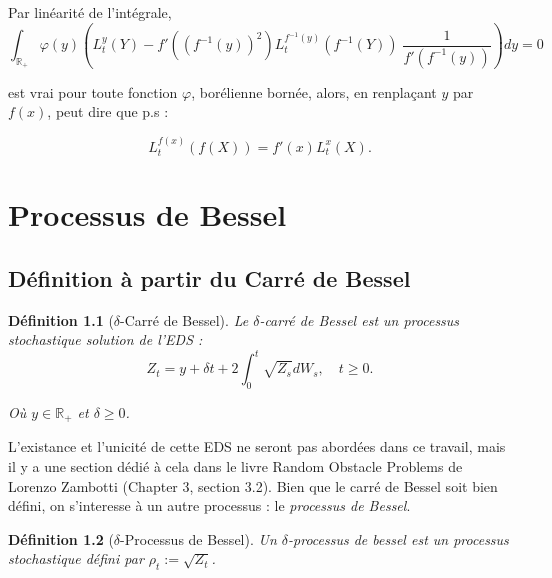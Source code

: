 \documentclass[openany]{book}
\makeatletter
\newcommand{\R}{\mathbb{R}}
\newcommand{\1}{\mathbbm{1}}
\renewenvironment{proof}[1][\textbf{\textit{Démonstration}}]{%
  \par\pushQED{\qed}%
  \normalfont\topsep6\p@\@plus6\p@\relax
  \trivlist\item[\hskip\labelsep
    #1\@addpunct{.}]\ignorespaces
}{%
  \popQED\endtrivlist\@endpefalse
}
\theoremstyle{thmfont}
\theoremstyle{deffont}
\newtheorem{definition}[definition]{Définition}
\theoremstyle{thmfont}
\theoremstyle{deffont}
\makeatother
\begin{document}
{\begin{proof}
Par linéarité de l'intégrale, 
$$\int_{\R_+} \varphi(y) \left( L_t^y(Y) -  f'\left((f^{-1}(y))^2\right) L_t^{f^{-1}(y)}(f^{-1}(Y)) \; \frac{1}{f'(f^{-1}(y))}\right) dy  = 0 $$

est vrai pour toute fonction $\varphi$, borélienne bornée, alors, en renplaçant $y$ par $f(x)$, peut dire que p.s :

$$L_t^{f(x)}(f(X)) =  f'(x) L_t^{x}(X).$$
\end{proof}
}

\chapter{Processus de Bessel}

\section{Définition à partir du Carré de Bessel} 
\begin{definition}[$\delta$-Carré de Bessel] Le \textit{$\delta$-carré de Bessel} est un processus stochastique solution de l'EDS :
  \begin{equation}
    Z_t = y + \delta t + 2 \int_0^t \sqrt{Z_s} dW_s, \quad t\geq0.
    \label{eq:EDSCarreBessel}
  \end{equation}

  Où $y\in\R_+$ et $\delta \geq 0$. 
\end{definition}

L'existance et l'unicité de cette EDS ne seront pas abordées dans ce travail, mais il y a une section dédié à cela dans le livre Random Obstacle Problems de Lorenzo Zambotti (Chapter 3, section 3.2).
Bien que le carré de Bessel soit bien défini, on s'interesse à un autre processus : le \textit{processus de Bessel}.

\begin{definition}[$\delta$-Processus de Bessel] Un $\delta$-\textit{processus de bessel} est un processus stochastique défini par $\rho_t := \sqrt{Z_t}$.
\end{definition}

\end{document}
